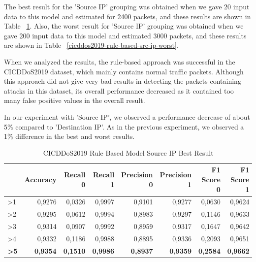\documentclass{article}
\begin{document}
The best result for the 'Source IP' grouping was obtained when we gave 20 input data to this model and estimated for 2400 packets, and these results are shown in Table ~\ref{cicddos2019-rule-based-src-ip-best}. Also, the worst result for 'Source IP' grouping was obtained when we gave 200 input data to this model and estimated 3000 packets, and these results are shown in Table ~\ref{cicddos2019-rule-based-src-ip-worst}.

When we analyzed the results, the rule-based approach was successful in the CICDDoS2019 dataset, which mainly contains normal traffic packets. Although this approach did not give very bad results in detecting the packets containing attacks in this dataset, its overall performance decreased as it contained too many false positive values in the overall result. 

In our experiment with 'Source IP', we observed a performance decrease of about 5\% compared to 'Destination IP'. As in the previous experiment, we observed a 1\% difference in the best and worst results.

\begin{table}
  \centering
  \caption{CICDDoS2019 Rule Based Model Source IP Best Result}
  \label{cicddos2019-rule-based-src-ip-best}
  \begin{tabular}{lrrrrrrr}
    \toprule
	{Rule & Accuracy & Recall 0 & Recall 1 & Precision 0 & Precision 1 & F1 Score 0 & F1 Score 1} \\
	\midrule
        >1 & 0,9276 & 0,0326 & 0,9997 & 0,9101 & 0,9277 & 0,0630 & 0,9624 \\ \hline
        >2 & 0,9295 & 0,0612 & 0,9994 & 0,8983 & 0,9297 & 0,1146 & 0,9633 \\ \hline
        >3 & 0,9314 & 0,0907 & 0,9992 & 0,8959 & 0,9317 & 0,1647 & 0,9642 \\ \hline
        >4 & 0,9332 & 0,1186 & 0,9988 & 0,8895 & 0,9336 & 0,2093 & 0,9651 \\ \hline
        \textbf{>5} & \textbf{0,9354} & \textbf{0,1510} & \textbf{0,9986} & \textbf{0,8937} & \textbf{0,9359} & \textbf{0,2584} & \textbf{0,9662} \\ 
	\bottomrule
  \end{tabular}
\end{table}
\end{document}
